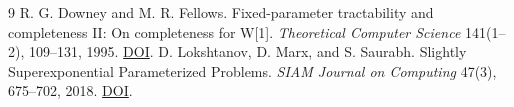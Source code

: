 \documentclass[11pt]{article}
\begin{document}
\begin{thebibliography}{9}
 R. G. Downey and M. R. Fellows.
Fixed-parameter tractability and completeness II: On completeness for W[1].
\emph{Theoretical Computer Science} 141(1--2), 109--131, 1995.
\href{https://doi.org/10.1016/0304-3975(94)00097-3}{DOI}.
 D. Lokshtanov, D. Marx, and S. Saurabh.
Slightly Superexponential Parameterized Problems.
\emph{SIAM Journal on Computing} 47(3), 675--702, 2018.
\href{https://doi.org/10.1137/16M1104834}{DOI}.
\end{thebibliography}
\end{document}
